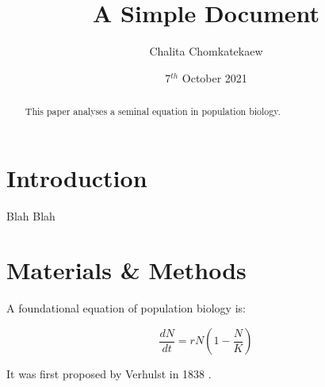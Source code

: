 \documentclass[12pt]{article}
\title{A Simple Document}
\author{Chalita Chomkatekaew}
\date{7$^{th}$ October 2021}
\begin{document}
\maketitle
	\begin{abstract}
	This paper analyses a seminal equation in population biology.
	\end{abstract}

	\section{Introduction}
	Blah Blah

	\section{Materials \& Methods}

	A foundational equation of population biology is:

	\begin{equation}
	\frac{dN}{dt} = r N (1 - \frac{N}{K})
	\end{equation}

	It was first proposed by Verhulst in 1838 \cite{verhulst1838notice}.

	

	
\end{document}
